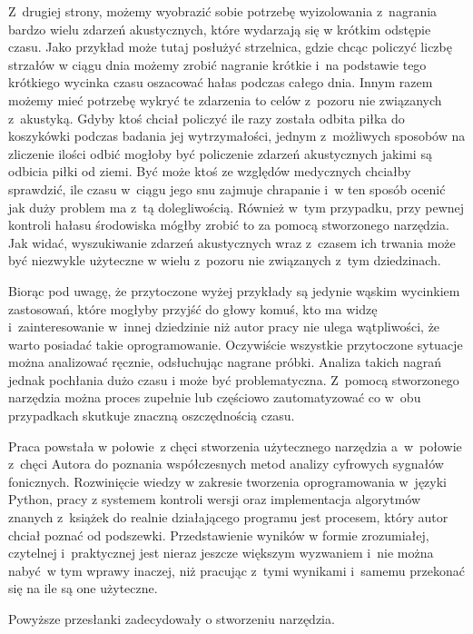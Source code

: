 \documentclass[eng,printmode]{mgr}
\begin{document}
Z~drugiej strony, możemy wyobrazić sobie potrzebę wyizolowania z~nagrania bardzo wielu zdarzeń akustycznych, które wydarzają się w krótkim odstępie czasu. Jako przykład może tutaj posłużyć strzelnica, gdzie chcąc policzyć liczbę strzałów w ciągu dnia możemy zrobić nagranie krótkie i~na podstawie tego krótkiego wycinka czasu oszacować hałas podczas całego dnia. Innym razem możemy mieć potrzebę wykryć te zdarzenia to celów z~pozoru nie związanych z~akustyką. Gdyby ktoś chciał policzyć ile razy została odbita piłka do koszykówki podczas badania jej wytrzymałości, jednym z~możliwych sposobów na zliczenie ilości odbić mogłoby być policzenie zdarzeń akustycznych jakimi są odbicia piłki od ziemi. Być może ktoś ze względów medycznych chciałby sprawdzić, ile czasu w~ciągu jego snu zajmuje chrapanie i~w ten sposób ocenić jak duży problem ma z~tą dolegliwością. Również w~tym przypadku, przy pewnej kontroli hałasu środowiska mógłby zrobić to za pomocą stworzonego narzędzia. Jak widać, wyszukiwanie zdarzeń akustycznych wraz z~czasem ich trwania może być niezwykle użyteczne w wielu z~pozoru nie związanych z~tym dziedzinach. 

Biorąc pod uwagę, że przytoczone wyżej przykłady są jedynie wąskim wycinkiem zastosowań, które mogłyby przyjść do głowy komuś, kto ma widzę i~zainteresowanie w~innej dziedzinie niż autor pracy nie ulega wątpliwości, że warto posiadać takie oprogramowanie. Oczywiście wszystkie przytoczone sytuacje można analizować ręcznie, odsłuchując nagrane próbki. Analiza takich nagrań jednak pochłania dużo czasu i może być problematyczna. Z~pomocą stworzonego narzędzia można proces zupełnie lub częściowo zautomatyzować co w~obu przypadkach skutkuje znaczną oszczędnością czasu. 

Praca powstała w połowie~z chęci stworzenia użytecznego narzędzia a~w~połowie z~chęci Autora do poznania współczesnych metod analizy cyfrowych sygnałów fonicznych. Rozwinięcie wiedzy w zakresie tworzenia oprogramowania w~języki Python, pracy z systemem kontroli wersji oraz implementacja algorytmów znanych z~książek do realnie działającego programu jest procesem, który autor chciał poznać od podszewki. Przedstawienie wyników w formie zrozumiałej, czytelnej i~praktycznej jest nieraz jeszcze większym wyzwaniem i~nie można nabyć~w tym wprawy inaczej, niż pracując z~tymi wynikami i~samemu przekonać się na ile są one użyteczne.

Powyższe przesłanki zadecydowały o stworzeniu narzędzia. 
\end{document}
